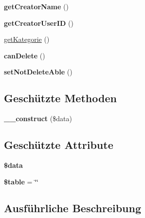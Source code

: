 \begin{DoxyCompactItemize}
\mbox{\label{class_abstract_termin_a624d07df4be086dd031e4e9775816d7f}} 
{\bfseries get\+Creator\+Name} ()
\item 
\mbox{\label{class_abstract_termin_a5c4ba1b80ee23fdfdec0f87d8baa55da}} 
{\bfseries get\+Creator\+User\+ID} ()
\item 
\mbox{\hyperlink{class_abstract_termin_a4b96c13047551fded5f2719eebb948d7}{get\+Kategorie}} ()
\item 
\mbox{\label{class_abstract_termin_a32480d022bd3c63e70b8b858f4bfedb5}} 
{\bfseries can\+Delete} ()
\item 
\mbox{\label{class_abstract_termin_ad7ffc41869c49ebea9f1ef0cd0adcaec}} 
{\bfseries set\+Not\+Delete\+Able} ()
\end{DoxyCompactItemize}
\subsection*{Geschützte Methoden}
\begin{DoxyCompactItemize}
\item 
\mbox{\label{class_abstract_termin_a330b4afce6fadb093ab321edb7311baf}} 
{\bfseries \+\_\+\+\_\+construct} (\$data)
\end{DoxyCompactItemize}
\subsection*{Geschützte Attribute}
\begin{DoxyCompactItemize}
\item 
\mbox{\label{class_abstract_termin_ae9e3b1f6250f774225de5ba2f50661ba}} 
{\bfseries \$data}
\item 
\mbox{\label{class_abstract_termin_aa7da0b73a9ea866134307c2918db2590}} 
{\bfseries \$table} = \char`\"{}\char`\"{}
\end{DoxyCompactItemize}


\subsection{Ausführliche Beschreibung}


